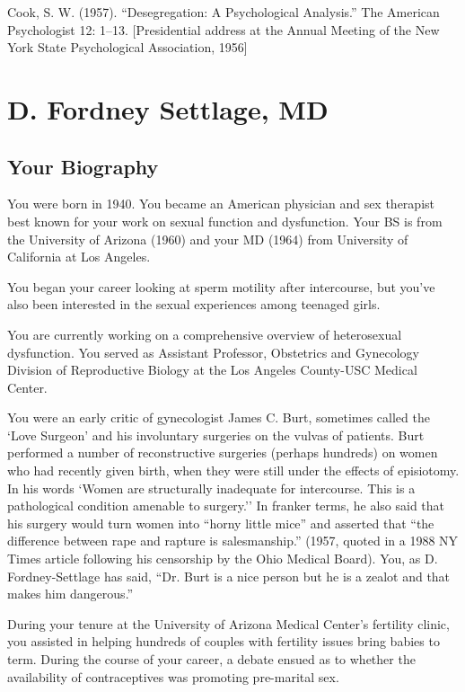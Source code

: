 \begin{refsection}
Cook, S. W. (1957). ``Desegregation: A Psychological Analysis.'' The American Psychologist 12: 1--13. [Presidential address at the Annual Meeting of the New York State Psychological Association, 1956]

\chapter{D. Fordney Settlage, MD}
\label{d.fordneysettlagemd}

\section{Your Biography}
\label{yourbiography}

You were born in 1940. You became an American physician and sex therapist best known for your work on sexual function and dysfunction. Your BS is from the University of Arizona (1960) and your MD (1964) from University of California at Los Angeles.

You began your career looking at sperm motility after intercourse, but you've also been interested in the sexual experiences among teenaged girls.

You are currently working on a comprehensive overview of heterosexual dysfunction. You served as Assistant Professor, Obstetrics and Gynecology Division of Reproductive Biology at the Los Angeles County-USC Medical Center.

You were an early critic of gynecologist James C. Burt, sometimes called the `Love Surgeon' and his involuntary surgeries on the vulvas of patients. Burt performed a number of reconstructive surgeries (perhaps hundreds) on women who had recently given birth, when they were still under the effects of episiotomy. In his words `Women are structurally inadequate for intercourse. This is a pathological condition amenable to surgery.'' In franker terms, he also said that his surgery would turn women into ``horny little mice'' and asserted that ``the difference between rape and rapture is salesmanship.'' (1957, quoted in a 1988 NY Times article following his censorship by the Ohio Medical Board). You, as D. Fordney-Settlage has said, ``Dr. Burt is a nice person but he is a zealot and that makes him dangerous.''

During your tenure at the University of Arizona Medical Center's fertility clinic, you assisted in helping hundreds of couples with fertility issues bring babies to term. During the course of your career, a debate ensued as to whether the availability of contraceptives was promoting pre-marital sex.


\end{refsection}
